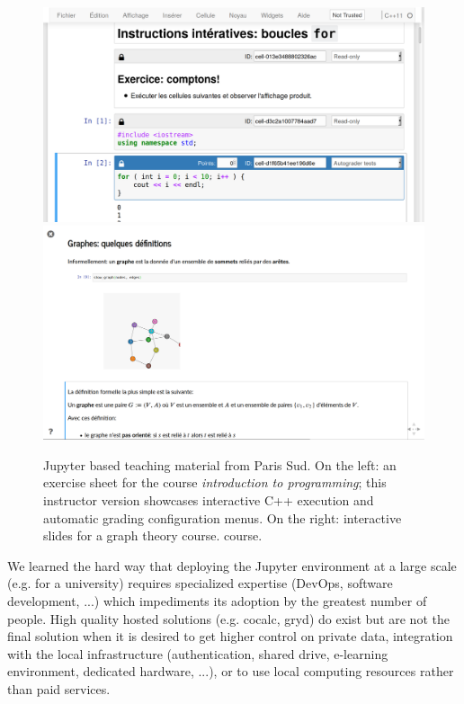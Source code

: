   \begin{figure}[ht!]\centering
  \includegraphics[width=.45\textwidth]{images/teaching-cling}\quad
  \includegraphics[width=.45\textwidth]{images/teaching-graphs}
  \caption{Jupyter based teaching material from Paris Sud. On the
    left: an exercise sheet for the course \emph{introduction to
      programming}; this instructor version showcases interactive C++
    execution and automatic grading configuration menus. On the right:
    interactive slides for a graph theory course.
    course.}\label{fig:teaching-cling}
  \end{figure}

  We learned the hard way that deploying the Jupyter environment at a
  large scale (e.g. for a university) requires specialized expertise
  (DevOps, software development, ...) which impediments its adoption
  by the greatest number of people. High quality hosted solutions
  (e.g. cocalc, gryd) do exist but are not the final solution when it
  is desired to get higher control on private data, integration with
  the local infrastructure (authentication, shared drive, e-learning
  environment, dedicated hardware, ...), or to use local computing
  resources rather than paid services.

